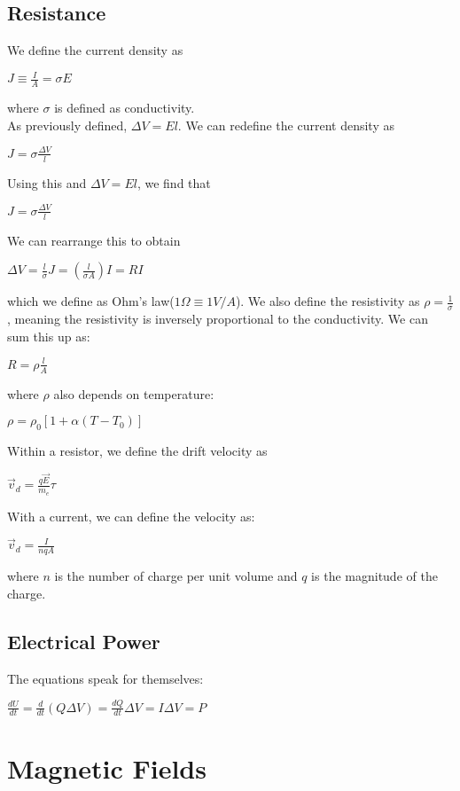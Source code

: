 \documentclass[12pt]{report}
\begin{document}
	\section{Resistance}
		We define the current density as\\
		\centerline{$J \equiv \frac{I}{A} = \sigma E$}
		where $\sigma$ is defined as conductivity.\\
		As previously defined, $\Delta V = El$. We can redefine the current density as \\
		\centerline{$J = \sigma \frac{\Delta V}{l}$}
		Using this and $\Delta V = El$, we find that \\
		\centerline{$J = \sigma \frac{\Delta V}{l}$}
		We can rearrange this to obtain \\
		\centerline{$\Delta V = \frac{l}{\sigma} J = (\frac{l}{\sigma A}) I = RI$}
		which we define as Ohm's law($1 \Omega \equiv 1 V/A$).
		We also define the resistivity as $\rho = \frac{1}{\sigma}$, meaning the resistivity is inversely proportional to the conductivity. We can sum this up as:\\
		\centerline{$R = \rho \frac{l}{A}$}
		where $\rho$ also depends on temperature:\\
		\centerline{$\rho = \rho_0 [1 + \alpha(T - T_0)]$} 
		Within a resistor, we define the drift velocity as\\
		\centerline{$\vec{v}_d = \frac{q\vec{E}}{m_e}\tau$}
		With a current, we can define the velocity as:\\
		\centerline{$\vec{v}_d = \frac{I}{nqA}$}
		where $n$ is the number of charge per unit volume and $q$ is the magnitude of the charge.
	\section{Electrical Power}
		The equations speak for themselves:\\
		\centerline{$\frac{dU}{dt} = \frac{d}{dt}(Q\Delta V) = \frac{dQ}{dt}\Delta V = I\Delta V = P$}
\chapter{Magnetic Fields}
\end{document}
